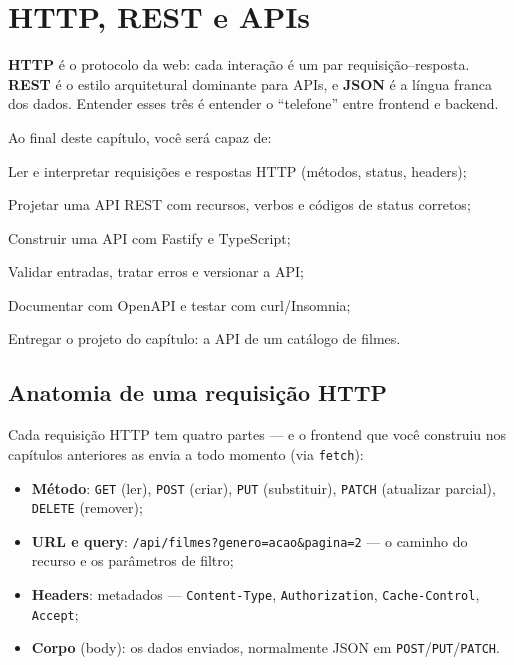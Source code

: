 \chapter{HTTP, REST e APIs}
\label{cap:http}

\begin{caixaconceito}
\textbf{HTTP} é o protocolo da web: cada interação é um par
requisição--resposta. \textbf{REST} é o estilo arquitetural dominante para
APIs, e \textbf{JSON} é a língua franca dos dados. Entender esses três é
entender o ``telefone'' entre frontend e backend.
\end{caixaconceito}

Ao final deste capítulo, você será capaz de:
\begin{objetivos}
  \item Ler e interpretar requisições e respostas HTTP (métodos, status, headers);
  \item Projetar uma API REST com recursos, verbos e códigos de status corretos;
  \item Construir uma API com Fastify e TypeScript;
  \item Validar entradas, tratar erros e versionar a API;
  \item Documentar com OpenAPI e testar com curl/Insomnia;
  \item Entregar o projeto do capítulo: a API de um catálogo de filmes.
\end{objetivos}

\section{Anatomia de uma requisição HTTP}

Cada requisição HTTP tem quatro partes — e o frontend que você construiu nos
capítulos anteriores as envia a todo momento (via \texttt{fetch}):

\begin{itemize}[leftmargin=*, itemsep=0.4em]
  \item \textbf{Método}: \texttt{GET} (ler), \texttt{POST} (criar),
  \texttt{PUT} (substituir), \texttt{PATCH} (atualizar parcial),
  \texttt{DELETE} (remover);
  \item \textbf{URL e query}: \texttt{/api/filmes?genero=acao\&pagina=2} —
  o caminho do recurso e os parâmetros de filtro;
  \item \textbf{Headers}: metadados — \texttt{Content-Type},
  \texttt{Authorization}, \texttt{Cache-Control}, \texttt{Accept};
  \item \textbf{Corpo} (body): os dados enviados, normalmente JSON em
  \texttt{POST}/\texttt{PUT}/\texttt{PATCH}.
\end{itemize}

